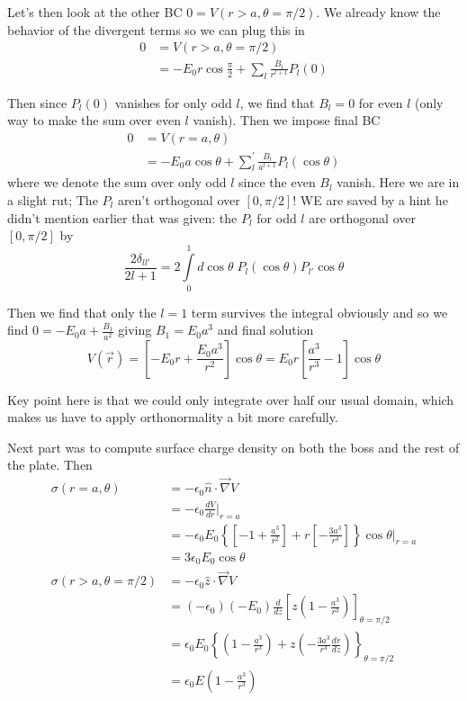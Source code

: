 \documentclass[10pt]{report}
\newcommand{\rd}[2]{\frac{d#1}{d#2}}
\begin{document}
Let's then look at the other BC $0 = V(r > a, \theta = \pi/2)$. We already know the behavior of the divergent terms so we can plug this in
\begin{align}
    0 &= V(r> a, \theta = \pi/2)\\
    &= -E_0r\cos\frac{\pi}{2} + \sum_{l}^{}\frac{B_l}{r^{l+1}}P_l(0)
\end{align}

Then since $P_l(0)$ vanishes for only odd $l$, we find that $B_l = 0$ for even $l$ (only way to make the sum over even $l$ vanish). Then we impose final BC
\begin{align}
    0 &= V(r = a, \theta)\\
    &= -E_0a\cos\theta + \sum_{l}^{\prime}\frac{B_l}{a^{l+1}}P_l(\cos\theta)
\end{align}
where we denote the sum over only odd $l$ since the even $B_l$ vanish. Here we are in a slight rut; The $P_l$ aren't orthogonal over $[0,\pi/2]$! WE are saved by a hint he didn't mention earlier that was given: the $P_l$ for odd $l$ are orthogonal over $[0,\pi/2]$ by
\begin{equation}
    \frac{2\delta_{ll'}}{2l+1} = 2\displaystyle\int\limits_{0}^{1}d\cos\theta\;P_l(\cos\theta)P_{l'}\cos\theta
\end{equation}

Then we find that only the $l = 1$ term survives the integral obviously and so we find $0 = -E_0a + \frac{B_1}{a^2}$ giving $B_1 = E_0a^3$ and final solution
\begin{equation}
    V(\vec{r}) = \left[ -E_0 r + \frac{E_0a^3}{r^2} \right]\cos\theta = E_0r\left[ \frac{a^3}{r^3} - 1 \right]\cos\theta
\end{equation}

Key point here is that we could only integrate over half our usual domain, which makes us have to apply orthonormality a bit more carefully.

Next part was to compute surface charge density on both the boss and the rest of the plate. Then 
\begin{align}
    \sigma(r=a,\theta)  &= -\epsilon_0\hat{n}\cdot \vec{\nabla}V\\
    &= -\epsilon_0\rd{V}{r}\Big|_{r=a}\\
    &= -\epsilon_0 E_0\left\{ \left[ -1 + \frac{a^3}{r^2} \right] + r\left[ -\frac{3a^3}{r^4} \right] \right\}\cos\theta\Big|_{r = a}\\
    &= 3\epsilon_0E_0\cos\theta\\
    \sigma(r > a, \theta = \pi/2) &= -\epsilon_0\hat{z}\cdot \vec{\nabla}V\\
    &= \left( -\epsilon_0 \right)\left( -E_0 \right)\rd{}{z}\left[ z\left( 1 - \frac{a^3}{r^3} \right) \right]_{\theta = \pi/2}\label{3.13.2}\\
    &= \epsilon_0E_0\left\{ \left( 1 - \frac{a^3}{r^3} \right) + z\left( -\frac{3a^3}{r^4}\rd{r}{z} \right) \right\}_{\theta = \pi/2}\label{3.13.1}\\
    &= \epsilon_0 E\left( 1-\frac{a^3}{r^3} \right)
\end{align}
\end{document}
